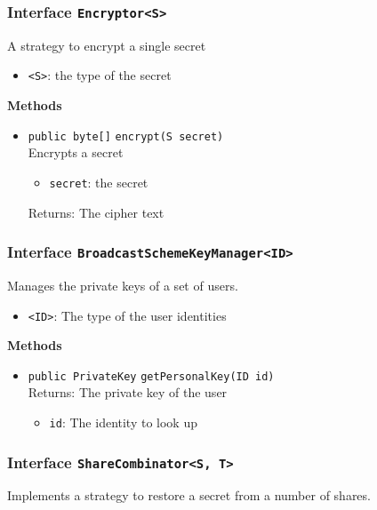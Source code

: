 \subsubsection{Interface \lstinline|Encryptor<S>|}
A strategy to encrypt a single secret \\


\begin{itemize}
\item \lstinline|<S>|: the type of the secret
\end{itemize}



\textbf{Methods}
\begin{itemize}
\item \lstinline|public byte[]| \lstinline|encrypt|\lstinline|(S secret)|\\
Encrypts a secret
\begin{itemize}
\item \lstinline|secret|: the secret
\end{itemize}

Returns: The cipher text

\end{itemize}

\subsubsection{Interface \lstinline|BroadcastSchemeKeyManager<ID>|}
Manages the private keys of a set of users. \\


\begin{itemize}
\item \lstinline|<ID>|: The type of the user identities
\end{itemize}



\textbf{Methods}
\begin{itemize}
\item \lstinline|public PrivateKey| \lstinline|getPersonalKey|\lstinline|(ID id)|\\
Returns: The private key of the user
\begin{itemize}
\item \lstinline|id|: The identity to look up
\end{itemize}



\end{itemize}

\subsubsection{Interface \lstinline|ShareCombinator<S, T>|}
Implements a strategy to restore a secret from a number of shares. \\



